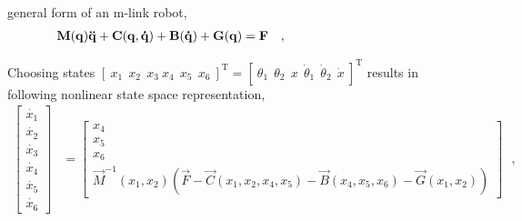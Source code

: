general form of an m-link robot, \cite{MWSpong, LSciavicco}
\begin{align}
\vec{M}(\vec{q})\vec{\ddot{q}} + \vec{C}(\vec{q},\vec{\dot{q}}) + \vec{B}(\vec{\dot{q}}) + \vec{G}(\vec{q}) &= \vec{F} \ \ \ , \hspace{3.3cm}
\end{align}
\begin{where}
                      {}
    {}
                            {}
                {}
          {}
\end{where}

Choosing states $ [\ x_1\ \ x_2\ \ x_3\ x_4\ \ x_5\ \ x_6\ ]^\mathrm{T} = [\ \theta_1\ \ \theta_2\ \ x\ \ \dot{\theta}_1\ \ \dot{\theta}_2\ \ \dot{x}\ ]^\mathrm{T} $ results in following nonlinear state space representation,
%
\begin{align}
\begin{bmatrix}
\dot{x_1} \\
\dot{x_2} \\
\dot{x_3} \\
\dot{x_4} \\
\dot{x_5} \\
\dot{x_6}
\end{bmatrix}
&=
\begin{bmatrix}
x_4 \\
x_5 \\
x_6 \\
\vec{M}^{-1}(x_1,x_2) ( \vec{F} - \vec{C}(x_1,x_2,x_4,x_5) - \vec{B}(x_4,x_5,x_6) - \vec{G}(x_1,x_2) )
\end{bmatrix}
\label{eq:nonlinearStateSpaceTwin} \ \ \ ,
\end{align}
%




